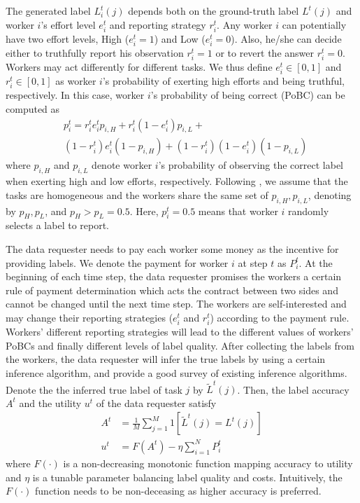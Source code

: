 \documentclass{article}
\begin{document}
The generated label $L^{t}_{i}(j)$ depends both on the ground-truth label $L^{t}(j)$ and worker $i$'s effort level $e^{t}_i$ and reporting strategy $r^{t}_i$.
Any worker $i$ can potentially have two effort levels, High ($e^{t}_i=1$) and Low ($e^{t}_i=0$).
Also, he/she can decide either to truthfully report his observation $r^{t}_i = 1$ or to revert the answer $r^{t}_i = 0$.
Workers may act differently for different tasks. 
We thus define $e^{t}_i\in[0,1]$ and $r^{t}_i\in[0,1]$ as worker $i$'s probability of exerting high efforts and being truthful, respectively.
In this case, worker $i$'s probability of being correct (PoBC) can be computed as
\begin{equation}
\begin{split}
&p^{t}_i=r^{t}_i e^{t}_i p_{i, H}+r^{t}_i (1-e^{t}_i) p_{i, L}+\\
&(1-r^{t}_i) e^{t}_i (1-p_{i, H})+(1-r^{t}_i) (1-e^{t}_i) (1-p_{i, L})
\end{split}
\end{equation}
where $p_{i, H}$ and $p_{i, L}$ denote worker $i$'s probability of observing the correct label when exerting high and low efforts, respectively.
Following \cite{dasgupta2013crowdsourced,liu2017sequential}, we assume that the tasks are homogeneous and the workers share the same set of $p_{i, H}, p_{i, L}$, denoting by $p_H, p_L$, and $p_{H}>p_{L}= 0.5$.
Here, $p^t_i=0.5$ means that worker $i$ randomly selects a label to report.

The data requester needs to pay each worker some money as the incentive for providing labels.
We denote the payment for worker $i$ at step $t$ as $P^{t}_{i}$.
At the beginning of each time step, the data requester promises the workers a certain rule of payment determination which acts the contract between two sides and cannot be changed until the next time step.
The workers are self-interested and may change their reporting strategies ($e^t_i$ and $r^t_i$) according to the payment rule.
Workers' different reporting strategies will lead to the different values of workers' PoBCs and finally different levels of label quality.
After collecting the labels from the workers, the data requester will infer the true labels by using a certain inference algorithm, and \cite{zheng2017truth} provide a good survey of existing inference algorithms.
Denote the the inferred true label of task $j$ by $\tilde{L}^{t}(j)$.
Then, the label accuracy $A^t$ and the utility $u^t$ of the data requester satisfy
\begin{equation}
\label{utility}
\begin{split}
A^t&=\frac{1}{M}{\sum}_{j=1}^{M}1\left[\tilde{L}^{t}(j)=L^{t}(j)\right]\\
u^t &= F(A^t) - \eta {\sum}_{i=1}^{N}P^t_i
\end{split}
\end{equation}
where $F(\cdot)$ is a non-decreasing monotonic function mapping accuracy to utility and $\eta$ is a
tunable parameter balancing label quality and costs. Intuitively, the $F(\cdot)$ function needs to be non-deceasing as higher accuracy is preferred.
\end{document}
